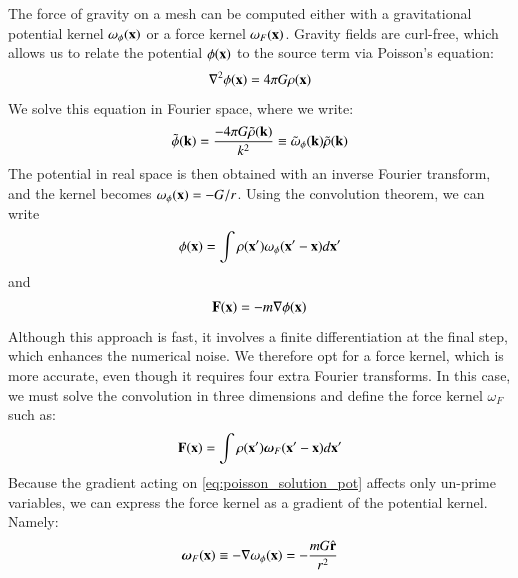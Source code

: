 \documentclass[useAMS,usenatbib]{mn2e}
\begin{document}
The force of gravity on a mesh can be computed either with a gravitational potential  kernel $\omega_{\phi} ({\bf x})$
  or a force  kernel $\omega_{F} ({\bf x})$.
Gravity fields are curl-free, which allows us to relate the potential $\phi({\bf x})$ to the source term via Poisson's equation: 
\begin{eqnarray}
\nabla^{2}\phi({\bf x}) = 4 \pi G \rho({\bf x})
\label{eq:poisson}
\end{eqnarray}
We solve this equation in Fourier space, where we write:
\begin{eqnarray}
 \tilde{\phi}({\bf k}) = \frac{-4 \pi G \tilde{\rho}({\bf k})}{k^{2}} \equiv \tilde{\omega}_{\phi}({\bf k})\tilde{\rho}({\bf k})
\label{eq:poissonFourier}
\end{eqnarray}
The potential in real space is then obtained with an inverse Fourier transform, and the kernel becomes $\omega_{\phi} ({\bf x}) = -G/r$.
Using the convolution theorem, we can write
\begin{eqnarray}
 \phi({\bf x}) = \int \rho({\bf x'}) \omega_{\phi}({\bf x'} - {\bf x}) d{\bf x'}   
\label{eq:poisson_solution_pot}
\end{eqnarray}
and
\begin{eqnarray}
{\bf F}({\bf x}) = - m {\bf \nabla} \phi({\bf x}) 
\label{eq:Force_sol}
\end{eqnarray}
Although this approach is fast, it involves a finite differentiation at the final step, which enhances the numerical noise.
We therefore opt for a force kernel, which is more accurate, even though it requires four extra Fourier transforms.
In this case, we must solve the convolution in three dimensions and define the force kernel {\boldmath $\omega$}$_{F}$ such as:
\begin{eqnarray}
 {\bf F}({\bf x}) =  \int \rho({\bf x'}) \mbox{\boldmath $\omega$}_{F}({\bf x'} - {\bf x}) d{\bf x'}                                      
\label{eq:poisson_solution_force}
\end{eqnarray}
Because the gradient acting on \ref{eq:poisson_solution_pot} affects only un-prime variables, we can express the force kernel as a gradient of the potential kernel. Namely:  
\begin{eqnarray}
\mbox{\boldmath $\omega$}_{F}({\bf x}) \equiv - {\bf \nabla}\omega_{\phi}({\bf x}) = - \frac{mG \hat{\bf r}}{r^{2}}
\end{eqnarray}
\end{document}
